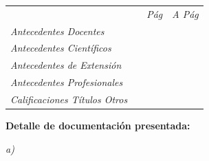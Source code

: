 \documentclass{article}
\begin{document}
\noindent \begin{tabular}{lccc}

\vspace{0.3cm}

 &\hspace{2cm} &\textit{\hspace{0.5cm} P\'ag \hspace{0.5cm}} & \textit{\hspace{0.5cm} A P\'ag \hspace{0.5cm}} \\

\vspace{0.1cm}

\textit{Antecedentes Docentes}& & \textbf{~\pageref{begin-docentes}} & \textbf{~\pageref{end-docentes}} \\

\vspace{0.1cm}

\textit{Antecedentes Científicos}& & \textbf{~\pageref{begin-cientificos}} & \textbf{~\pageref{end-cientificos}} \\

\vspace{0.1cm}

\textit{Antecedentes de Extensión}& & \textbf{~\pageref{begin-extension}} & \textbf{~\pageref{end-extension}} \\

\vspace{0.1cm}

\textit{Antecedentes Profesionales}& & \textbf{~\pageref{begin-profesionales}} & \textbf{~\pageref{end-profesionales}} \\

\vspace{0.1cm}

\textit{Calificaciones Títulos Otros}& & \textbf{~\pageref{begin-otros}} & \textbf{~\pageref{end-otros}} \\

\end{tabular}

\bigskip
\bigskip
\bigskip

{\noindent \bf Detalle de documentación presentada:}

\bigskip

\noindent \textit{a)} \hfill \hdashrule{16cm}{0.5pt}{0.75pt}

\medskip

\hdashrule{\linewidth}{0.5pt}{0.75pt}

\medskip
\end{document}
